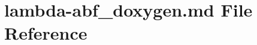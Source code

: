 \hypertarget{lambda-abf__doxygen_8md}{\section{lambda-\/abf\-\_\-doxygen.md File Reference}
\label{lambda-abf__doxygen_8md}
}
